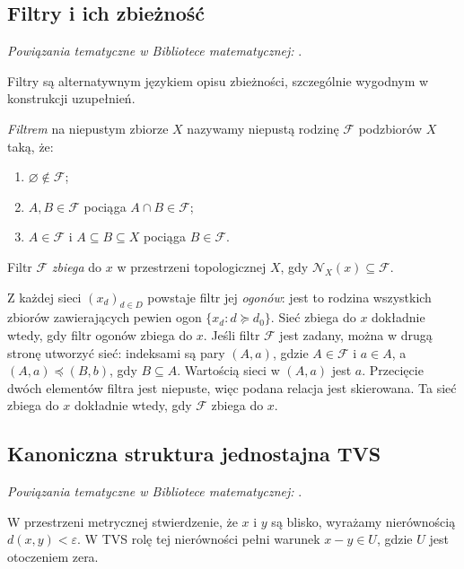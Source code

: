 \subsection{Filtry i ich zbieżność}

\noindent\emph{Powiązania tematyczne w Bibliotece matematycznej:} .


Filtry są alternatywnym językiem opisu zbieżności, szczególnie
wygodnym w konstrukcji uzupełnień.

\begin{definicja}[Filtr]\label{def:filter}
\emph{Filtrem} na niepustym zbiorze $X$ nazywamy niepustą rodzinę
$\mathcal F$ podzbiorów $X$ taką, że:
\begin{enumerate}[label=\textup{(\roman*)}]
\item $\varnothing\notin\mathcal F$;
\item $A,B\in\mathcal F$ pociąga $A\cap B\in\mathcal F$;
\item $A\in\mathcal F$ i $A\subseteq B\subseteq X$ pociąga
      $B\in\mathcal F$.
\end{enumerate}
Filtr $\mathcal F$ \emph{zbiega} do $x$ w przestrzeni topologicznej $X$,
gdy $\mathcal N_X(x)\subseteq\mathcal F$.
\end{definicja}

Z każdej sieci $(x_d)_{d\in D}$ powstaje filtr jej \emph{ogonów}:
jest to rodzina wszystkich zbiorów zawierających pewien ogon
$\{x_d:d\succeq d_0\}$. Sieć zbiega do $x$ dokładnie wtedy,
gdy filtr ogonów zbiega do $x$. Jeśli filtr $\mathcal F$ jest zadany,
można w drugą stronę utworzyć sieć: indeksami są pary $(A,a)$,
gdzie $A\in\mathcal F$ i $a\in A$, a
$(A,a)\preceq(B,b)$, gdy $B\subseteq A$.
Wartością sieci w $(A,a)$ jest $a$. Przecięcie dwóch elementów filtra
jest niepuste, więc podana relacja jest skierowana. Ta sieć zbiega
do $x$ dokładnie wtedy, gdy $\mathcal F$ zbiega do $x$.

\subsection{Kanoniczna struktura jednostajna TVS}

\noindent\emph{Powiązania tematyczne w Bibliotece matematycznej:} .


W przestrzeni metrycznej stwierdzenie, że $x$ i $y$ są blisko,
wyrażamy nierównością $d(x,y)<\varepsilon$. W TVS rolę tej nierówności
pełni warunek $x-y\in U$, gdzie $U$ jest otoczeniem zera.

